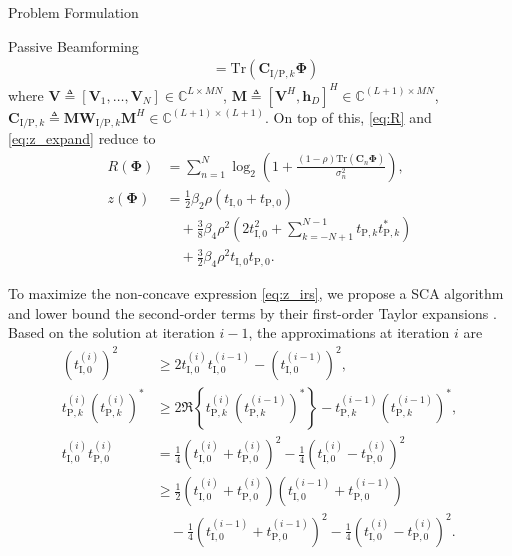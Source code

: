 \documentclass[journal]{IEEEtran}
\begin{document}
\begin{section}{Problem Formulation}
\begin{subsection}{Passive Beamforming}
\begin{align}
				& = \mathrm{Tr}(\boldsymbol{C}_{\mathrm{I/P},k}\boldsymbol{\Phi})\label{eq:t_k}
			\end{align}
			where $\boldsymbol{V} \triangleq [\boldsymbol{V}_1,\dots,\boldsymbol{V}_N] \in \mathbb{C}^{L \times MN}$, $\boldsymbol{M} \triangleq [\boldsymbol{V}^H, \boldsymbol{h}_{D}]^H \in \mathbb{C}^{(L+1) \times MN}$, $\boldsymbol{C}_{\mathrm{I/P},k} \triangleq \boldsymbol{M}\boldsymbol{W}_{\mathrm{I/P},k}\boldsymbol{M}^H \in \mathbb{C}^{(L+1)\times(L+1)}$. On top of this, \eqref{eq:R} and \eqref{eq:z_expand} reduce to
			\begin{align}
				R(\boldsymbol{\Phi})
				& = \sum_{n=1}^{N}{\log_2\left(1+\frac{(1-\rho)\mathrm{Tr}(\boldsymbol{C}_n\boldsymbol{\Phi})}{\sigma_n^2}\right)},\label{eq:R_irs}\\
				z(\boldsymbol{\Phi})
				& = \frac{1}{2}{\beta_2}{\rho}(t_{\mathrm{I},0}+t_{\mathrm{P},0})\nonumber\\
				& \quad + \frac{3}{8}{\beta_4}{\rho^2} \left(2t_{\mathrm{I},0}^2 + \sum_{k=-N+1}^{N-1}{t_{\mathrm{P},k}t_{\mathrm{P},k}^*}\right)\nonumber\\
				& \quad + \frac{3}{2}{\beta_4}{\rho^2}t_{\mathrm{I},0}t_{\mathrm{P},0}.\label{eq:z_irs}
			\end{align}

			To maximize the non-concave expression \eqref{eq:z_irs}, we propose a SCA algorithm and lower bound the second-order terms by their first-order Taylor expansions \cite{Adali2010}. Based on the solution at iteration $i - 1$, the approximations at iteration $i$ are
			\begin{align}
				(t_{\mathrm{I},0}^{(i)})^2
				& \ge 2 t_{\mathrm{I},0}^{(i)}t_{\mathrm{I},0}^{(i-1)} - (t_{\mathrm{I},0}^{(i-1)})^2,\label{eq:taylor_1}\\
				t_{\mathrm{P},k}^{(i)} (t_{\mathrm{P},k}^{(i)})^*
				& \ge 2 \Re\left\{t_{\mathrm{P},k}^{(i)} (t_{\mathrm{P},k}^{(i-1)})^*\right\} - t_{\mathrm{P},k}^{(i-1)} (t_{\mathrm{P},k}^{(i-1)})^*,\label{eq:taylor_2}\\
				t_{\mathrm{I},0}^{(i)} t_{\mathrm{P},0}^{(i)}
				& = \frac{1}{4}(t_{\mathrm{I},0}^{(i)} + t_{\mathrm{P},0}^{(i)})^2 - \frac{1}{4}(t_{\mathrm{I},0}^{(i)} - t_{\mathrm{P},0}^{(i)})^2\nonumber\\
				& \ge \frac{1}{2}(t_{\mathrm{I},0}^{(i)} + t_{\mathrm{P},0}^{(i)})(t_{\mathrm{I},0}^{(i-1)} + t_{\mathrm{P},0}^{(i-1)})\nonumber\\
				& \quad - \frac{1}{4}(t_{\mathrm{I},0}^{(i-1)} + t_{\mathrm{P},0}^{(i-1)})^2 - \frac{1}{4}(t_{\mathrm{I},0}^{(i)} - t_{\mathrm{P},0}^{(i)})^2.\label{eq:taylor_3}
			\end{align}


\end{subsection}
\end{section}
\end{document}
